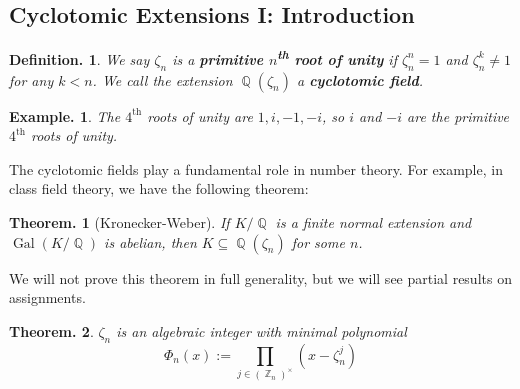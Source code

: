 \documentclass[11pt, a4paper]{memoir}
\DeclareMathOperator{\Q}{{\mathbb{Q}}}
\DeclareMathOperator{\Z}{{\mathbb{Z}}}
\theoremstyle{change}
\newtheorem{theorem}{Theorem.}[section]
\theoremstyle{plain}
\theoremstyle{nonumberplain}
\newtheorem{definition}{Definition.}
\newtheorem{example}{Example.}
\DeclareMathOperator{\Gal}{Gal}
\newcommand{\mbf}[1]{{\boldmath\bfseries #1}}
\numberwithin{equation}{section}
\begin{document}
\subsection{Cyclotomic Extensions I: Introduction}
\begin{definition}
    We say $\zeta_n$ is a \mbf{primitive $n$\textsuperscript{th} root of unity} if $\zeta_n^n=1$ and $\zeta_n^k\neq 1$ for any $k<n$.
    We call the extension $\Q(\zeta_n)$ a \mbf{cyclotomic field}.
\end{definition}
\begin{example}
    The $4^\text{th}$ roots of unity are $1,i,-1,-i$, so $i$ and $-i$ are the primitive $4^\text{th}$ roots of unity.
\end{example}
The cyclotomic fields play a fundamental role in number theory.
For example, in class field theory, we have the following theorem:
\begin{theorem}[Kronecker-Weber]
    If $K/\Q$ is a finite normal extension and $\Gal(K/\Q)$ is abelian, then $K\subseteq\Q(\zeta_n)$ for some $n$.
\end{theorem}
We will not prove this theorem in full generality, but we will see partial results on assignments.
\begin{theorem}
    $\zeta_n$ is an algebraic integer with minimal polynomial
    \begin{equation*}
        \Phi_n(x):=\prod_{j\in(\Z_n)^\times}(x-\zeta_n^j)
    \end{equation*}
\end{theorem}
\end{document}

